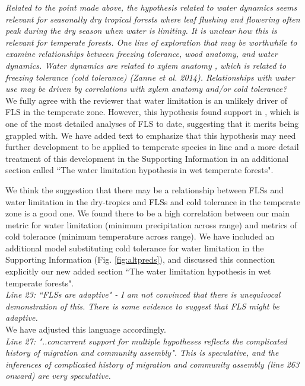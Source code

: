 \documentclass{article}[11pt]
\begin{document}
\emph{Related to the point made above, the hypothesis related to water dynamics seems relevant for seasonally dry tropical forests where leaf flushing and flowering often peak during the dry season when water is limiting. It is unclear how this is relevant for temperate forests. One line of exploration that may be worthwhile to examine relationships between freezing tolerance, wood anatomy, and water dynamics. Water dynamics are related to xylem anatomy , which is related to freezing tolerance (cold tolerance) (Zanne et al. 2014). Relationships with water use may be driven by correlations with xylem anatomy and/or cold tolerance?}\\

\noindent We fully agree with the reviewer that water limitation is an unlikely driver of FLS in the temperate zone. However, this hypothesis found support in \citet{Gougherty2018}, which is one of the most detailed analyses of FLS to date, suggesting that it merits being grappled with. We have added text to emphasize that this hypothesis may need further development to be applied to temperate species in line  and a more detail treatment of this development in the Supporting Information in an additional section called ``The water limitation hypothesis in wet temperate forests".

\noident We think the suggestion that there may be a relationship between FLSs and water limitation in the dry-tropics and FLSs and cold tolerance in the temperate zone is a good one. We found there to be a high correlation between our main metric for water limitation (minimum precipitation across range) and metrics of cold tolerance (minimum temperature across range). We have included an additional model substituting cold tolerance for water limitation in the Supporting Information (Fig. \ref{fig:altpreds}), and discussed this connection explicitly our new added section  ``The water limitation hypothesis in wet temperate forests".\\

\emph{Line 23: ``FLSs are adaptive" - I am not convinced that there is unequivocal demonstration of this. There is some evidence to suggest that FLS might be adaptive.}\\

\noident We have adjusted this language accordingly.\\

\emph{Line 27: "..concurrent support for multiple hypotheses reflects the complicated history of migration and community assembly". This is speculative, and the inferences of complicated history of migration and community assembly (line 263 onward) are very speculative.}\\
\end{document}
